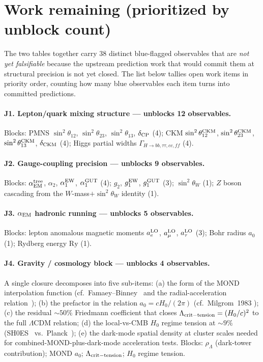 \documentclass[reprint,amsmath,amssymb,aps,prd,longbibliography,floatfix]{revtex4-2}
\begin{document}
\section{Work remaining (prioritized by unblock count)}

The two tables together carry 38 distinct blue-flagged
observables that are \emph{not yet falsifiable} because the
upstream prediction work that would commit them at structural
precision is not yet closed. The list below tallies open work
items in priority order, counting how many blue observables each
item turns into committed predictions.

\paragraph{J1. Lepton/quark mixing structure ---
unblocks 12 observables.}
Blocks: PMNS $\sin^2\theta_{12}$, $\sin^2\theta_{23}$,
$\sin^2\theta_{13}$, $\delta_{\rm CP}$ (4); CKM
$\sin^2\theta_{12}^{\rm CKM}$, $\sin^2\theta_{23}^{\rm CKM}$,
$\sin^2\theta_{13}^{\rm CKM}$, $\delta_{\rm CKM}$ (4); Higgs partial
widths $\Gamma_{H\to bb,\tau\tau,cc,ff}$ (4).

\paragraph{J2. Gauge-coupling precision --- unblocks 9 observables.}
Blocks: $\alpha_{\rm EM}^{\rm tree}$, $\alpha_2$, $\alpha_1^{\rm EW}$,
$\alpha_1^{\rm GUT}$ (4); $g_2$, $g_1^{\rm EW}$, $g_1^{\rm GUT}$ (3);
$\sin^2\theta_W$ (1); $Z$ boson cascading from the
$W$-mass$+\sin^2\theta_W$ identity (1).

\paragraph{J3. $\alpha_{\rm EM}$ hadronic running ---
unblocks 5 observables.} Blocks: lepton anomalous magnetic
moments $a_e^{\rm LO}$, $a_\mu^{\rm LO}$, $a_\tau^{\rm LO}$ (3);
Bohr radius $a_0$ (1); Rydberg energy $\mathrm{Ry}$ (1).

\paragraph{J4. Gravity / cosmology block --- unblocks 4
observables.} A single closure decomposes into five sub-items:
(a) the form of the MOND interpolation function (cf.\
Famaey--Binney~\cite{FamaeyBinney2005} and the radial-acceleration
relation~\cite{McGaughLelliSchombert2016}); (b) the prefactor in
the relation $a_0 = c H_0/(2\pi)$ (cf.\ Milgrom~1983
\cite{Milgrom1983}); (c) the residual $\sim 50\%$ Friedmann
coefficient that closes $\Lambda_{\rm crit-tension} = (H_0/c)^2$
to the full $\Lambda$CDM relation; (d) the local-vs-CMB $H_0$
regime tension at $\sim 9\%$ (SH0ES~\cite{Riess2022}
vs.\ Planck~\cite{Planck2018VI}); (e) the dark-mode spatial
density at cluster scales needed for combined-MOND-plus-dark-mode
acceleration tests. Blocks: $\rho_\Lambda$ (dark-tower contribution);
MOND $a_0$; $\Lambda_{\rm crit-tension}$; $H_0$ regime tension.
\end{document}
